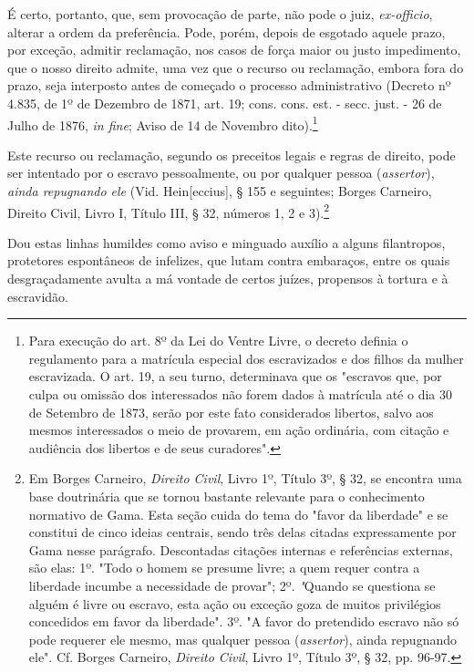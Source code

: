 É certo, portanto, que, sem provocação de parte, não pode o juiz,
\emph{ex-officio}, alterar a ordem da preferência. Pode, porém, depois
de esgotado aquele prazo, por exceção, admitir reclamação, nos casos de
força maior ou justo impedimento, que o nosso direito admite, uma vez
que o recurso ou reclamação, embora fora do prazo, seja interposto antes
de começado o processo administrativo (Decreto nº 4.835, de 1º de
Dezembro de 1871, art. 19; cons. cons. est. - secc. just. - 26 de Julho
de 1876, \emph{in fine}; Aviso de 14 de Novembro dito).\footnote{Para
  execução do art. 8º da Lei do Ventre Livre, o decreto definia o
  regulamento para a matrícula especial dos escravizados e dos filhos da
  mulher escravizada. O art. 19, a seu turno, determinava que os
  "escravos que, por culpa ou omissão dos interessados não forem dados à
  matrícula até o dia 30 de Setembro de 1873, serão por este fato
  considerados libertos, salvo aos mesmos interessados o meio de
  provarem, em ação ordinária, com citação e audiência dos libertos e de
  seus curadores".}

Este recurso ou reclamação, segundo os preceitos legais e regras de
direito, pode ser intentado por o escravo pessoalmente, ou por qualquer
pessoa (\emph{assertor}), \emph{ainda repugnando ele} (Vid.
Hein{[}eccius{]}, § 155 e seguintes; Borges Carneiro, Direito Civil,
Livro I, Título III, § 32, números 1, 2 e 3).\footnote{Em Borges
  Carneiro, \emph{Direito Civil}, Livro 1º, Título 3º, § 32, se encontra
  uma base doutrinária que se tornou bastante relevante para o
  conhecimento normativo de Gama. Esta seção cuida do tema do "favor da
  liberdade" e se constitui de cinco ideias centrais, sendo três delas
  citadas expressamente por Gama nesse parágrafo. Descontadas citações
  internas e referências externas, são elas: 1º. "Todo o homem se
  presume livre; a quem requer contra a liberdade incumbe a necessidade
  de provar"; 2º. \emph{"}Quando se questiona se alguém é livre ou
  escravo, esta ação ou exceção goza de muitos privilégios concedidos em
  favor da liberdade". 3º. "A favor do pretendido escravo não só pode
  requerer ele mesmo, mas qualquer pessoa (\emph{assertor}), ainda
  repugnando ele". Cf. Borges Carneiro, \emph{Direito Civil}, Livro 1º,
  Título 3º, § 32, pp. 96-97.}

Dou estas linhas humildes
como aviso e minguado auxílio a alguns filantropos, protetores
espontâneos de infelizes, que lutam contra embaraços, entre os quais
desgraçadamente avulta a má vontade de certos juízes, propensos à
tortura e à escravidão.

